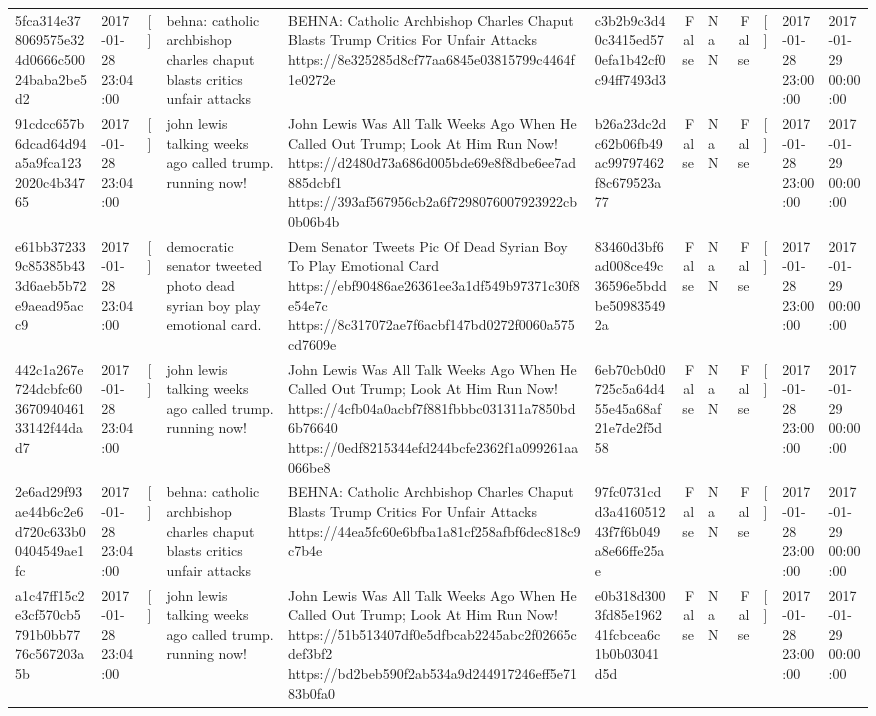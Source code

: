 \begin{tabular}{llllllrlrlll}
5fca314e378069575e324d0666c50024baba2be5d2 & 2017-01-28 23:04:00 & [] & behna: catholic archbishop charles chaput blasts critics unfair attacks & BEHNA: Catholic Archbishop Charles Chaput Blasts Trump Critics For Unfair Attacks https://8e325285d8cf77aa6845e03815799c4464f1e0272e & c3b2b9c3d40c3415ed570efa1b42cf0c94ff7493d3 & False & NaN & False & [] & 2017-01-28 23:00:00 & 2017-01-29 00:00:00 \\
91cdcc657b6dcad64d94a5a9fca1232020c4b34765 & 2017-01-28 23:04:00 & [] & john lewis talking weeks ago called trump. running now! & John Lewis Was All Talk Weeks Ago When He Called Out Trump; Look At Him Run Now! https://d2480d73a686d005bde69e8f8dbe6ee7ad885dcbf1 https://393af567956cb2a6f7298076007923922cb0b06b4b & b26a23dc2dc62b06fb49ac99797462f8c679523a77 & False & NaN & False & [] & 2017-01-28 23:00:00 & 2017-01-29 00:00:00 \\
e61bb372339c85385b433d6aeb5b72e9aead95acc9 & 2017-01-28 23:04:00 & [] & democratic senator tweeted photo dead syrian boy play emotional card. & Dem Senator Tweets Pic Of Dead Syrian Boy To Play Emotional Card https://ebf90486ae26361ee3a1df549b97371c30f8e54e7c https://8c317072ae7f6acbf147bd0272f0060a575cd7609e & 83460d3bf6ad008ce49c36596e5bddbe509835492a & False & NaN & False & [] & 2017-01-28 23:00:00 & 2017-01-29 00:00:00 \\
442c1a267e724dcbfc60367094046133142f44dad7 & 2017-01-28 23:04:00 & [] & john lewis talking weeks ago called trump. running now! & John Lewis Was All Talk Weeks Ago When He Called Out Trump; Look At Him Run Now! https://4cfb04a0acbf7f881fbbbc031311a7850bd6b76640 https://0edf8215344efd244bcfe2362f1a099261aa066be8 & 6eb70cb0d0725c5a64d455e45a68af21e7de2f5d58 & False & NaN & False & [] & 2017-01-28 23:00:00 & 2017-01-29 00:00:00 \\
2e6ad29f93ae44b6c2e6d720c633b00404549ae1fc & 2017-01-28 23:04:00 & [] & behna: catholic archbishop charles chaput blasts critics unfair attacks & BEHNA: Catholic Archbishop Charles Chaput Blasts Trump Critics For Unfair Attacks https://44ea5fc60e6bfba1a81cf258afbf6dec818c9c7b4e & 97fc0731cdd3a416051243f7f6b049a8e66ffe25ae & False & NaN & False & [] & 2017-01-28 23:00:00 & 2017-01-29 00:00:00 \\
a1c47ff15c2e3cf570cb5791b0bb7776c567203a5b & 2017-01-28 23:04:00 & [] & john lewis talking weeks ago called trump. running now! & John Lewis Was All Talk Weeks Ago When He Called Out Trump; Look At Him Run Now! https://51b513407df0e5dfbcab2245abc2f02665cdef3bf2 https://bd2beb590f2ab534a9d244917246eff5e7183b0fa0 & e0b318d3003fd85e196241fcbcea6c1b0b03041d5d & False & NaN & False & [] & 2017-01-28 23:00:00 & 2017-01-29 00:00:00 \\

\end{tabular}
